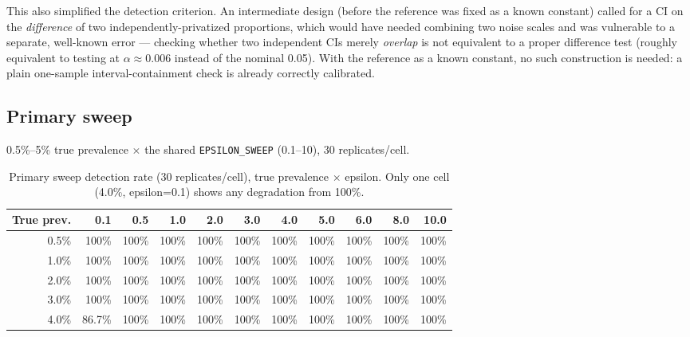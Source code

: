 \documentclass[11pt]{article}
\begin{document}
This also simplified the detection criterion. An intermediate design (before the reference was fixed as a known constant) called for a CI on the \emph{difference} of two independently-privatized proportions, which would have needed combining two noise scales and was vulnerable to a separate, well-known error --- checking whether two independent CIs merely \emph{overlap} is not equivalent to a proper difference test (roughly equivalent to testing at $\alpha\approx0.006$ instead of the nominal 0.05). With the reference as a known constant, no such construction is needed: a plain one-sample interval-containment check is already correctly calibrated.

\subsection{Primary sweep}
\label{sec:primary}

0.5\%--5\% true prevalence $\times$ the shared \texttt{EPSILON\_SWEEP} (0.1--10), 30 replicates/cell.

\begin{table}[H]
\centering
\footnotesize
\begin{tabular}{r*{10}{r}}
\toprule
True prev. & 0.1 & 0.5 & 1.0 & 2.0 & 3.0 & 4.0 & 5.0 & 6.0 & 8.0 & 10.0 \\
\midrule
0.5\%  & 100\% & 100\% & 100\% & 100\% & 100\% & 100\% & 100\% & 100\% & 100\% & 100\% \\
1.0\%  & 100\% & 100\% & 100\% & 100\% & 100\% & 100\% & 100\% & 100\% & 100\% & 100\% \\
2.0\%  & 100\% & 100\% & 100\% & 100\% & 100\% & 100\% & 100\% & 100\% & 100\% & 100\% \\
3.0\%  & 100\% & 100\% & 100\% & 100\% & 100\% & 100\% & 100\% & 100\% & 100\% & 100\% \\
4.0\%  & 86.7\% & 100\% & 100\% & 100\% & 100\% & 100\% & 100\% & 100\% & 100\% & 100\% \\
\bottomrule
\end{tabular}
\caption{Primary sweep detection rate (30 replicates/cell), true prevalence $\times$ epsilon. Only one cell (4.0\%, epsilon=0.1) shows any degradation from 100\%.}
\label{tab:primary}
\end{table}
\end{document}
